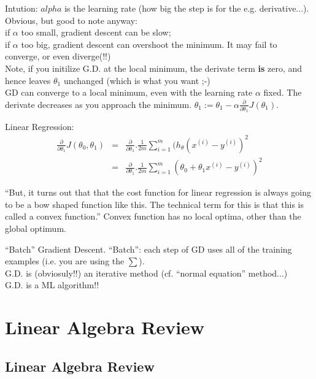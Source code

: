 \documentclass[11pt,a4paper]{article}
\begin{document}
\noindent
Intution:
$alpha$ is the learning rate (how big the step is for the e.g. derivative...).\\
Obvious, but good to note anyway: \\
if $\alpha$ too small, gradient descent can be slow; \\
if $\alpha$ too big, gradient descent can overshoot the minimum. It may fail to 
converge, or even diverge(!!) \\

Note, if you initilize G.D. at the local minimum, the derivate term {\bf is} zero, 
and hence leaves $\theta_{1}$ unchanged (which is what you want ;-) \\

GD can converge to a local minimum, even with the learning rate
$\alpha$ fixed. The derivate decreases as you approach the minimum. 
$\theta_{1} := \theta_{1} - \alpha \frac{\partial}{\partial \theta_{1}} J(\theta_{1})$.

\noindent
Linear Regression:
\begin{eqnarray}
\frac{\partial}{\partial \theta_{1}} J(\theta_{0}, \theta_{1}) & = & \frac{\partial}{\partial \theta_{1}}.\frac{1}{2m}\sum_{i=1}^{m}(h_{\theta} (x^{(i)} - y^{(i)})^2\\
 & = &  \frac{\partial}{\partial \theta_{1}}.\frac{1}{2m}\sum_{i=1}^{m}(\theta_{0} + \theta_{1} x^{(i)} - y^{(i)})^2
\end{eqnarray}

``But, it turns out that that the cost function for linear regression is always going to be a bow shaped function like this. The technical term for this is that this is called a convex function.''
Convex function has no local optima, other than the global optimum. 

``Batch'' Gradient Descent. ``Batch'': each step of GD uses all of the training examples (i.e. you are using the $\sum$).\\ 
G.D. is (obviosuly!!) an iterative method (cf. ``normal equation'' method...)\\
G.D. is a ML algorithm!!\\


\section{Linear Algebra Review}
    \subsection{Linear Algebra Review}
\end{document}
